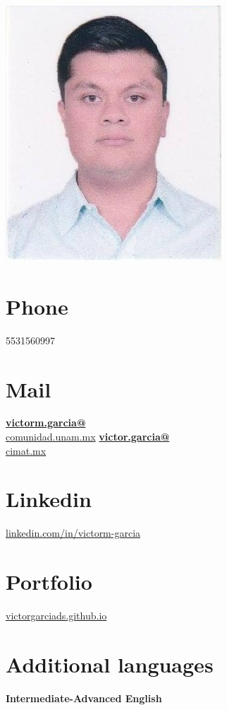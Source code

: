 \documentclass[]{friggeri-cv}
\begin{document}
\begin{aside}
  \includegraphics[scale=0.268]{img/foto2.png}
  \section{Phone}
    5531560997
  \section{Mail}
    \href{mailto:victorm.garcia@comunidad.unam.mx}{\textbf{victorm.garcia@}\\comunidad.unam.mx}
    \href{mailto:victor.garcia@cimat.mx}{\textbf{victor.garcia@}\\cimat.mx}
    \section{Linkedin}
    \url{linkedin.com/in/victorm-garcia}%
    \section{Portfolio}
    \url{victorgarciads.github.io}%
     \section{Additional languages}
    \textbf{Intermediate-Advanced English}

\end{aside}
\end{document}
